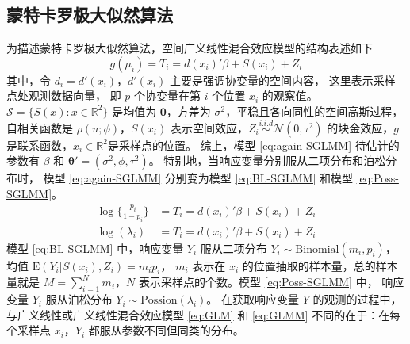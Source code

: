 \documentclass[12pt,a4paper,UTF8,twoside]{book}
\theoremstyle{definition}
\theoremstyle{definition}
\theoremstyle{definition}
\theoremstyle{remark}
\begin{document}
\hypertarget{subsec:MCML}{%
\subsection{蒙特卡罗极大似然算法}\label{subsec:MCML}}

为描述蒙特卡罗极大似然算法，空间广义线性混合效应模型的结构表述如下
\begin{equation}
g(\mu_i) = T_{i} = d(x_i)'\beta + S(x_i) + Z_i \label{eq:again-SGLMM}
\end{equation} \noindent 其中，令 \(d_{i} = d'(x_i)\)，\(d'(x_i)\)
主要是强调协变量的空间内容， 这里表示采样点处观测数据向量， 即 \(p\)
个协变量在第 \(i\) 个位置 \(x_i\) 的观察值。
\(\mathcal{S} = \{S(x): x \in \mathbb{R}^2\}\) 是均值为
\(\mathbf{0}\)，方差为
\(\sigma^2\)，平稳且各向同性的空间高斯过程，自相关函数是
\(\rho(u;\phi)\)，\(S(x_i)\)
表示空间效应，\(Z_i \stackrel{i.i.d}{\sim} \mathcal{N}(0,\tau^2)\)
的块金效应，\(g\) 是联系函数，\(x_i \in \mathbb{R}^2\)是采样点的位置。
综上，模型 \eqref{eq:again-SGLMM} 待估计的参数有 \(\beta\) 和
\(\boldsymbol{\theta}' = (\sigma^2,\phi,\tau^2)\)。
特别地，当响应变量分别服从二项分布和泊松分布时， 模型
\eqref{eq:again-SGLMM} 分别变为模型 \eqref{eq:BL-SGLMM} 和模型
\eqref{eq:Poss-SGLMM}。 \begin{align}
\log\{\frac{p_i}{1-p_i}\} & = T_{i} = d(x_i)'\beta + S(x_i) + Z_i  \label{eq:BL-SGLMM}\\
\log(\lambda_i)           & = T_{i} = d(x_i)'\beta + S(x_i) + Z_i  \label{eq:Poss-SGLMM}
\end{align} \noindent 模型 \eqref{eq:BL-SGLMM} 中，响应变量 \(Y_i\)
服从二项分布 \(Y_i \sim \mathrm{Binomial}(m_i,p_i)\)， 均值
\(\mathrm{E}(Y_i|S(x_i),Z_i)=m_{i}p_{i}\)， \(m_i\) 表示在 \(x_i\)
的位置抽取的样本量，总的样本量就是 \(M = \sum_{i=1}^{N}m_i\)，\(N\)
表示采样点的个数。模型 \eqref{eq:Poss-SGLMM} 中， 响应变量 \(Y_i\)
服从泊松分布 \(Y_i \sim \mathrm{Possion}(\lambda_i)\)。 在获取响应变量
\(Y\) 的观测的过程中，与广义线性或广义线性混合效应模型 \eqref{eq:GLM} 和
\eqref{eq:GLMM} 不同的在于：在每个采样点 \(x_i\)，\(Y_i\)
都服从参数不同但同类的分布。
\end{document}
